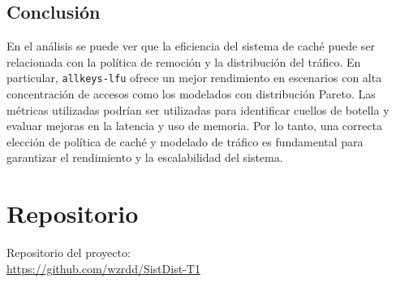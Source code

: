 \documentclass[12pt]{udpreport}
\begin{document}
\subsection{Conclusión}
En el análisis se puede ver que la eficiencia del sistema de caché puede ser relacionada con la política de remoción y la distribución del tráfico. En particular, \texttt{allkeys-lfu} ofrece un mejor rendimiento en escenarios con alta concentración de accesos como los modelados con distribución Pareto. Las métricas utilizadas podrían ser utilizadas para identificar cuellos de botella y evaluar mejoras en la latencia y uso de memoria. Por lo tanto, una correcta elección de política de caché y modelado de tráfico es fundamental para garantizar el rendimiento y la escalabilidad del sistema.


\section{Repositorio}
\noindent Repositorio del proyecto: \\[0.5cm]
\url{https://github.com/wzrdd/SistDist-T1}
\end{document}

